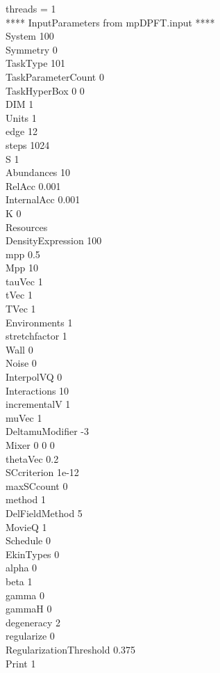 \documentclass[a4paper,10pt]{article}
\begin{document}
threads = 1\\**** InputParameters from mpDPFT.input ****\\System 100\\Symmetry 0\\TaskType 101\\TaskParameterCount 0\\TaskHyperBox 0 0\\DIM 1\\Units 1\\edge 12\\steps 1024\\S 1\\Abundances 10\\RelAcc 0.001\\InternalAcc 0.001\\K 0\\Resources\\DensityExpression 100\\mpp 0.5\\Mpp 10\\tauVec 1\\tVec 1\\TVec 1\\Environments 1\\stretchfactor 1\\Wall 0\\Noise 0\\InterpolVQ 0\\Interactions 10\\incrementalV 1\\muVec 1\\DeltamuModifier -3\\Mixer 0 0 0\\thetaVec 0.2\\SCcriterion 1e-12\\maxSCcount 0\\method 1\\DelFieldMethod 5\\MovieQ 1\\Schedule 0\\EkinTypes 0\\alpha 0\\beta 1\\gamma 0\\gammaH 0\\degeneracy 2\\regularize 0\\RegularizationThreshold 0.375\\Print 1\\\newpage 
\end{document}
